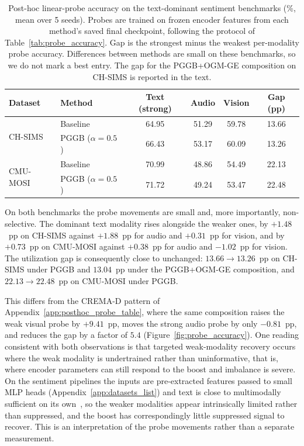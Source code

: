 \documentclass{article}
\begin{document}
\begin{table}[H]
\centering
\caption{Post-hoc linear-probe accuracy on the text-dominant sentiment benchmarks (\%, mean over 5 seeds). Probes are trained on frozen encoder features from each method's saved final checkpoint, following the protocol of Table~\ref{tab:probe_accuracy}. Gap is the strongest minus the weakest per-modality probe accuracy. Differences between methods are small on these benchmarks, so we do not mark a best entry. The gap for the PGGB+OGM-GE composition on CH-SIMS is reported in the text.}
\label{tab:probe_accuracy_sentiment}
\vspace{0.3em}
\begin{tabular}{llcccc}
\toprule
\textbf{Dataset} & \textbf{Method} & \textbf{Text (strong)} & \textbf{Audio} & \textbf{Vision} & \textbf{Gap (pp)} \\
\midrule
\multirow{2}{*}{CH-SIMS}  & Baseline              & 64.95 & 51.29 & 59.78 & 13.66 \\
                          & PGGB ($\alpha{=}0.5$) & 66.43 & 53.17 & 60.09 & 13.26 \\
\midrule
\multirow{2}{*}{CMU-MOSI} & Baseline              & 70.99 & 48.86 & 54.49 & 22.13 \\
                          & PGGB ($\alpha{=}0.5$) & 71.72 & 49.24 & 53.47 & 22.48 \\
\bottomrule
\end{tabular}
\end{table}

On both benchmarks the probe movements are small and, more importantly, non-selective. The dominant text modality rises alongside the weaker ones, by $+1.48$~pp on CH-SIMS against $+1.88$~pp for audio and $+0.31$~pp for vision, and by $+0.73$~pp on CMU-MOSI against $+0.38$~pp for audio and $-1.02$~pp for vision. The utilization gap is consequently close to unchanged: $13.66 \to 13.26$~pp on CH-SIMS under PGGB and $13.04$~pp under the PGGB+OGM-GE composition, and $22.13 \to 22.48$~pp on CMU-MOSI under PGGB.

This differs from the CREMA-D pattern of Appendix~\ref{app:posthoc_probe_table}, where the same composition raises the weak visual probe by $+9.41$~pp, moves the strong audio probe by only $-0.81$~pp, and reduces the gap by a factor of $5.4$ (Figure~\ref{fig:probe_accuracy}). One reading consistent with both observations is that targeted weak-modality recovery occurs where the weak modality is undertrained rather than uninformative, that is, where encoder parameters can still respond to the boost and imbalance is severe. On the sentiment pipelines the inputs are pre-extracted features passed to small MLP heads (Appendix~\ref{app:datasets_list}) and text is close to multimodally sufficient on its own~\citep{liu2022chsimsv2,wei2025dgl}, so the weaker modalities appear intrinsically limited rather than suppressed, and the boost has correspondingly little suppressed signal to recover. This is an interpretation of the probe movements rather than a separate measurement.
\end{document}
